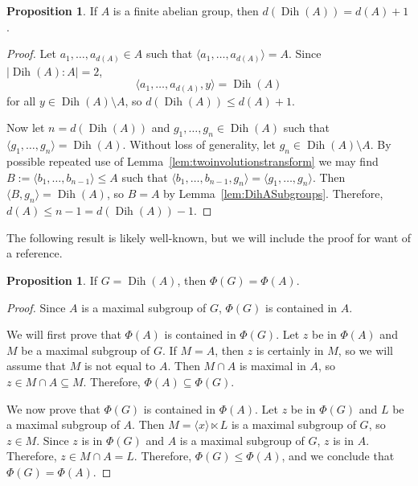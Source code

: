 \documentclass[12pt]{amsart}
\theoremstyle{definition}
\newtheorem{proposition}[equation]{Proposition}
\theoremstyle{definition}
\numberwithin{equation}{section}
\begin{document}
\begin{proposition}\label{prop:NumberOfGenerators}
If $A$ is a finite abelian group, then $d({\operatorname{Dih}}(A))=d(A)+1$.
\end{proposition}
\begin{proof}
Let $a_1,\ldots,a_{d(A)} \in A$ such that $\langle a_1,\ldots,a_{d(A)}\rangle =A$.  Since $|{\operatorname{Dih}}(A):A|=2$, \[\langle a_1,\ldots,a_{d(A)},y\rangle={\operatorname{Dih}}(A)\] for all $y \in {\operatorname{Dih}}(A) \setminus A$, so $d({\operatorname{Dih}}(A)) \leq d(A)+1$.  

Now let $n=d({\operatorname{Dih}}(A))$ and  $g_1,\ldots,g_n \in {\operatorname{Dih}}(A)$ such that $\langle g_1,\ldots,g_n \rangle = {\operatorname{Dih}}(A)$.  Without loss of generality, let $g_n \in {\operatorname{Dih}}(A) \setminus A$.  
By possible repeated use of Lemma~\ref{lem:twoinvolutionstransform}
we may find $B:=\langle b_1,\ldots,b_{n-1}\rangle \leq A$ such that $\langle b_1,\ldots,b_{n-1},g_n \rangle = \langle g_1,\ldots,g_n\rangle.$    
Then $\langle B,g_n \rangle={\operatorname{Dih}}(A)$, so $B=A$ by Lemma~\ref{lem:DihASubgroups}.  Therefore, $d(A) \leq n-1 = d({\operatorname{Dih}}(A))-1$.   
\end{proof}

The following result is likely well-known, but we will include the proof for want of a reference.

\begin{proposition}\label{prop:FrattiniInclusion}
If $G={\operatorname{Dih}}(A)$, then $\Phi(G)=\Phi(A)$.  
\end{proposition}

\begin{proof}
Since $A$ is a maximal subgroup of $G$, $\Phi(G)$ is contained in $A$.  

We will first prove that $\Phi(A)$ is contained in $\Phi(G)$.  Let $z$ be in $\Phi(A)$ and $M$ be a maximal subgroup of $G$.  
If $M=A$, then $z$ is certainly in $M$, so we will assume that $M$ is not equal to $A$.  
Then $M \cap A$ is maximal in $A$, so $z \in M \cap A \subseteq M$.  Therefore, $\Phi(A) \subseteq \Phi(G)$.  

We now prove that $\Phi(G)$ is contained in $\Phi(A)$.  Let $z$ be in $\Phi(G)$ and $L$ be a maximal subgroup of $A$.  
Then $M= \langle x \rangle \ltimes L$ 
is a maximal subgroup of $G$, so $z \in M$.   
Since $z$ is in $\Phi(G)$ and $A$ is a maximal subgroup of $G$, $z$ is in $A$.
Therefore, $z \in M \cap A = L$.  
Therefore, $\Phi(G) \leq \Phi(A)$, and we conclude that $\Phi(G)=\Phi(A)$.    
\end{proof}
\end{document}
